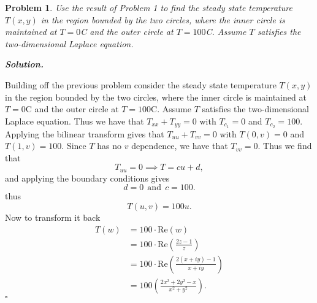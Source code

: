 \documentclass[12pt]{report}
\newtheorem{problem}{Problem}
\newenvironment{solution}[1][\it{Solution}]{\textbf{#1. } }{$\square$}
\newcommand{\paren}[1]{{\left(#1\right)}} %
\begin{document}


\begin{problem}
    Use the result of Problem 1 to find the steady state temperature $T (x, y)$ in the region bounded by the two circles, where the inner circle is maintained at $T = 0$C and the outer circle at $T = 100$C. Assume $T$ satisfies the two-dimensional Laplace equation.
\end{problem}

\begin{solution}
    
    \noindent
    Building off the previous problem consider the steady state temperature $T (x, y)$ in the region bounded by the two circles, where the inner circle is maintained at $T = 0$C and the outer circle at $T = 100$C. Assume $T$ satisfies the two-dimensional Laplace equation. Thus we have that $T_{xx} + T_{yy} = 0$ with $T_{c_1} = 0$ and $T_{c_2} = 100$. Applying the bilinear transform gives that $T_{uu} + T_{vv} = 0$ with $T(0,v) = 0$ and $T(1,v) = 100.$ Since $T$ has no $v$ dependence, we have that $T_{vv} = 0$. Thus we find that
    \[ T_{uu} = 0 \implies T = cu + d,\]
    and applying the boundary conditions gives
    \[ d = 0 ~~ \text{and} ~~ c = 100. \]
    thus
    \[ T(u,v) = 100 u.\]
    Now to transform it back
    \begin{align*}
        T(w) &= 100 \cdot \mathrm{Re}(w)\\
        &= 100 \cdot \mathrm{Re}\paren{ \frac{2z - 1}{z}}\\
        &= 100 \cdot \mathrm{Re}\paren{\frac{2(x + iy) - 1}{x + iy}}\\
        &= 100 \paren{\frac{2x^2 + 2y^2 - x}{x^2 + y^2}}.
    \end{align*}
\end{solution}

\newpage
\end{document}
